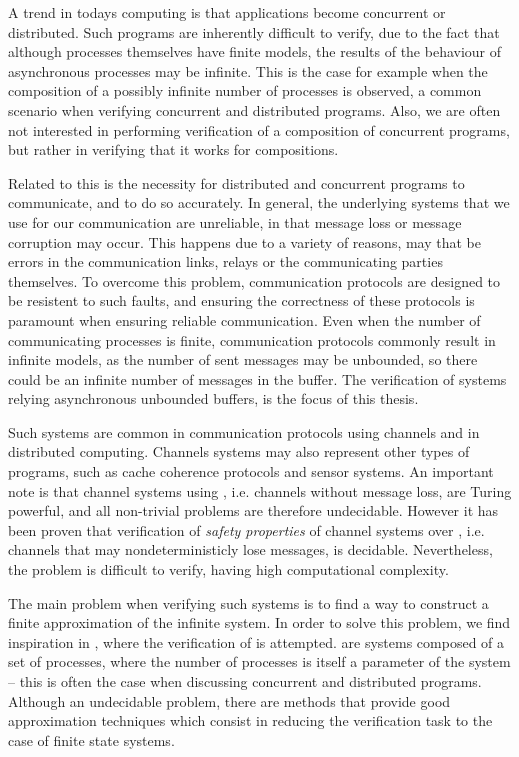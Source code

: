 A trend in todays computing is that applications become concurrent or distributed. Such programs are inherently difficult to verify, due to the fact that although processes themselves have finite models, the results of the behaviour of asynchronous processes may be infinite. This is the case for example when the composition of a possibly infinite number of processes is observed, a common scenario when verifying  concurrent and distributed programs. Also, we are often not interested in performing verification of a  composition of concurrent programs, but rather in verifying that it works for  compositions.

Related to this is the necessity for distributed and concurrent programs to communicate, and to do so accurately. In general, the underlying systems that we use for our communication are unreliable, in that message loss or message corruption may occur. This happens due to a variety of reasons, may that be errors in the communication links, relays or the communicating parties themselves. To overcome this problem, communication protocols are designed to be resistent to such faults, and ensuring the correctness of these protocols is paramount when ensuring reliable communication. Even when the number of communicating processes is finite, communication protocols commonly result in infinite models, as the number of sent messages may be unbounded, so there could be an infinite number of messages in the buffer. The verification of systems relying asynchronous unbounded buffers, is the focus of this thesis.

Such systems are common in communication protocols using channels and in distributed computing\cite{fredlund2007mcerlang}. Channels systems may also represent other types of programs, such as cache coherence protocols and sensor systems\cite{zuck2004}. An important note is that channel systems using , i.e. channels without message loss, are Turing powerful, and all non-trivial problems are therefore undecidable. However it has been proven that verification of \emph{safety properties} of channel systems over , i.e. channels that may nondeterministicly lose messages, is decidable\cite{287591}\cite{gordon}. Nevertheless, the problem is difficult to verify, having high computational complexity.

The main problem when verifying such systems is to find a way to construct a finite approximation of the infinite system. In order to solve this problem, we find inspiration in \cite{parosh}, where the verification of  is attempted.  are systems composed of a set of processes, where the number of processes is itself a parameter of the system -- this is often the case when discussing concurrent and distributed programs. Although an undecidable problem, there are methods that provide good approximation techniques which consist in reducing the verification task to the case of finite state systems.

